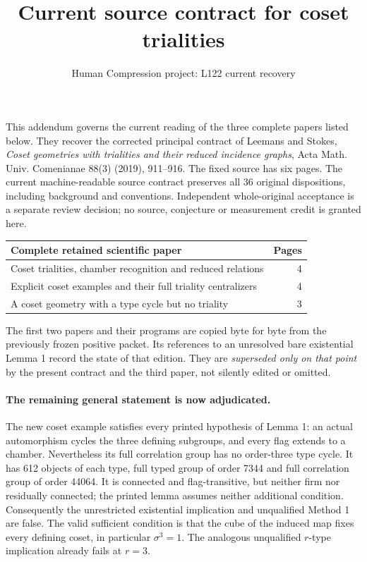 \documentclass[11pt,a4paper]{article}
\title{Current source contract for coset trialities}
\author{Human Compression project: L122 current recovery}\date{}
\begin{document}
\maketitle
This addendum governs the current reading of the three complete papers
listed below. They recover the corrected principal contract of Leemans
and Stokes, \emph{Coset geometries with trialities and their reduced
incidence graphs}, Acta Math. Univ. Comenianae 88(3) (2019), 911--916.
The fixed source has six pages. The current machine-readable source
contract preserves all 36 original dispositions, including background
and conventions. Independent whole-original acceptance is a separate
review decision; no source, conjecture or measurement credit is granted here.

\begin{center}\begin{tabular}{p{10.3cm}r}\toprule
Complete retained scientific paper&Pages\\\midrule
Coset trialities, chamber recognition and reduced relations&4\\
Explicit coset examples and their full triality centralizers&4\\
A coset geometry with a type cycle but no triality&3\\\bottomrule
\end{tabular}\end{center}
The first two papers and their programs are copied byte for byte from
the previously frozen positive packet. Its references to an unresolved
bare existential Lemma 1 record the state of that edition. They are
\emph{superseded only on that point} by the present contract and the third
paper, not silently edited or omitted.

\paragraph{The remaining general statement is now adjudicated.}
The new coset example satisfies every printed hypothesis of Lemma 1:
an actual automorphism cycles the three defining subgroups, and every
flag extends to a chamber. Nevertheless its full correlation group has
no order-three type cycle. It has 612 objects of each type, full typed
group of order 7344 and full correlation group of order 44064.
It is connected and flag-transitive, but neither firm nor residually
connected; the printed lemma assumes neither additional condition.
Consequently the unrestricted existential implication and unqualified
Method 1 are false. The valid sufficient condition is that the cube of
the induced map fixes every defining coset, in particular $\sigma^3=1$.
The analogous unqualified $r$-type implication already fails at $r=3$.
\end{document}
